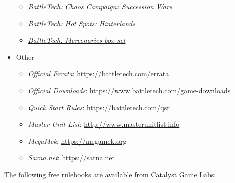 \begin{itemize}
\begin{itemize}
    \item \emph{\href{https://store.catalystgamelabs.com/products/battletech-chaos-campaign-succession-wars}{BattleTech: Chaos Campaign: Succession Wars}}

    \item \emph{\href{https://store.catalystgamelabs.com/products/battletech-hot-spots-hinterlands}{BattleTech: Hot Spots: Hinterlands}}

    \item \emph{\href{https://store.catalystgamelabs.com/products/battletech-mercenaries-box-set}{BattleTech: Mercenaries box set}}

  \end{itemize}

  \item Other

  \begin{itemize}

    \item \emph{Official Errata}: \href{https://battletech.com/errata}{https://battletech.com/errata}

    \item \emph{Official Downloads}: \href{https://www.battletech.com/game-downloads}{https://www.battletech.com/game-downloads}

    \item \emph{Quick Start Rules}: \href{https://battletech.com/qsr}{https://battletech.com/qsr}

    \item \emph{Master Unit List}: \href{http://www.masterunitlist.info}{http://www.masterunitlist.info}

    \item \emph{MegaMek}: \href{https://megamek.org}{https://megamek.org}

    \item \emph{Sarna.net}: \href{https://sarna.net}{https://sarna.net}

  \end{itemize}

\end{itemize}

The following free rulebooks are available from Catalyst Game Labs:

